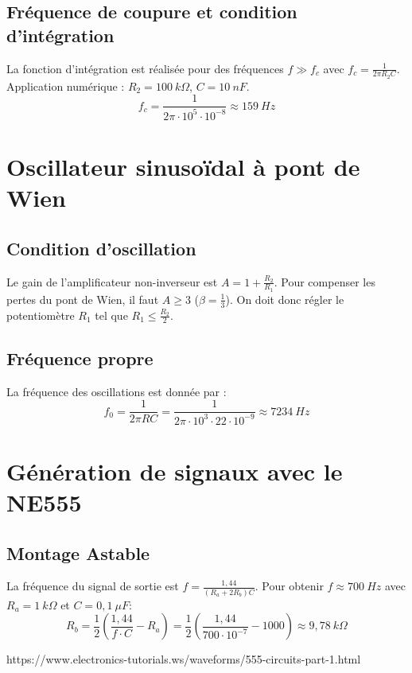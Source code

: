 \documentclass[12pt, a4paper]{article}
\begin{document}
\subsection{Fréquence de coupure et condition d'intégration}
La fonction d'intégration est réalisée pour des fréquences $f \gg f_c$ avec $f_c = \frac{1}{2\pi R_2 C}$.
Application numérique : $R_2 = 100~k\Omega$, $C = 10~nF$.
$$f_c = \frac{1}{2\pi \cdot 10^5 \cdot 10^{-8}} \approx 159~Hz$$


\section{Oscillateur sinusoïdal à pont de Wien}
\subsection{Condition d'oscillation}
Le gain de l'amplificateur non-inverseur est $A = 1 + \frac{R_2}{R_1}$. Pour compenser les pertes du pont de Wien, il faut $A \geq 3$ ($\beta = \frac{1}{3}$).
On doit donc régler le potentiomètre $R_1$ tel que $R_1 \leq \frac{R_2}{2}$.

\subsection{Fréquence propre}
La fréquence des oscillations est donnée par :
$$f_0 = \frac{1}{2\pi RC} = \frac{1}{2\pi \cdot 10^3 \cdot 22 \cdot 10^{-9}} \approx 7234~Hz$$

\section{Génération de signaux avec le NE555}
\subsection{Montage Astable}
La fréquence du signal de sortie est $f = \frac{1,44}{(R_a + 2R_b)C}$.
Pour obtenir $f \approx 700~Hz$ avec $R_a = 1~k\Omega$ et $C = 0,1~\mu F$:
$$R_b = \frac{1}{2} \left( \frac{1,44}{f \cdot C} - R_a \right) = \frac{1}{2} \left( \frac{1,44}{700 \cdot 10^{-7}} - 1000 \right) \approx 9,78~k\Omega$$


https://www.electronics-tutorials.ws/waveforms/555-circuits-part-1.html
\end{document}
